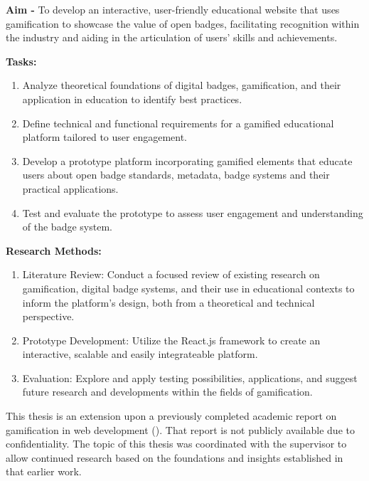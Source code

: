 \textbf{Aim -} To develop an interactive, user-friendly educational website that uses gamification to showcase the value of open badges, facilitating recognition within the industry and aiding in the articulation of users’ skills and achievements.

\textbf{Tasks:} 
\begin{enumerate}
  \addtolength{\itemsep}{-0.5\baselineskip} 
  \item Analyze theoretical foundations of digital badges, gamification, and their application in education to identify best practices.
  \item Define technical and functional requirements for a gamified educational platform tailored to user engagement.
  \item Develop a prototype platform incorporating gamified elements that educate users about open badge standards, metadata, badge systems and their practical applications.
  \item Test and evaluate the prototype to assess user engagement and understanding of the badge system.
\end{enumerate}

\textbf{Research Methods:}
\begin{enumerate}
  \addtolength{\itemsep}{-0.5\baselineskip} 
  \item Literature Review: Conduct a focused review of existing research on gamification, digital badge systems, and their use in educational contexts to inform the platform's design, both from a theoretical and technical perspective.
  \item Prototype Development: Utilize the React.js framework to create an interactive, scalable and easily integrateable platform.
  \item Evaluation: Explore and apply testing possibilities, applications, and suggest future research and developments within the fields of gamification.
\end{enumerate}

This thesis is an extension upon a previously completed academic report on gamification in web development (\cite{me2024}). 
That report is not publicly available due to confidentiality. 
The topic of this thesis was coordinated with the supervisor to allow continued research based on the foundations and insights established in that earlier work.
\newpage
